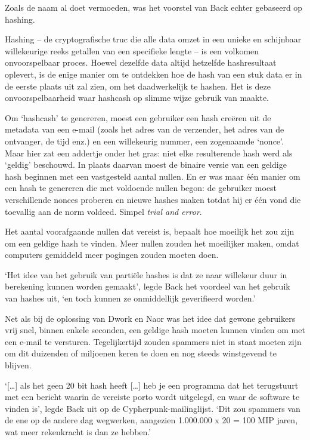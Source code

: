 \documentclass[
  a5paper,
  smalldemyvopaper,11pt,twoside,onecolumn,openright,extrafontsizes]{memoir}
\begin{document}
Zoals de naam al doet vermoeden, was het voorstel van Back echter
gebaseerd op hashing.

Hashing -- de cryptografische truc die alle data omzet in een unieke en
schijnbaar willekeurige reeks getallen van een specifieke lengte -- is
een volkomen onvoorspelbaar proces. Hoewel dezelfde data altijd
hetzelfde hashresultaat oplevert, is de enige manier om te ontdekken hoe
de hash van een stuk data er in de eerste plaats uit zal zien, om het
daadwerkelijk te hashen. Het is deze onvoorspelbaarheid waar hashcash op
slimme wijze gebruik van maakte.

Om `hashcash' te genereren, moest een gebruiker een hash creëren uit de
metadata van een e-mail (zoals het adres van de verzender, het adres van
de ontvanger, de tijd enz.) en een willekeurig nummer, een zogenaamde
`nonce'. Maar hier zat een addertje onder het gras: niet elke
resulterende hash werd als `geldig' beschouwd. In plaats daarvan moest
de binaire versie van een geldige hash beginnen met een vastgesteld
aantal nullen. En er was maar één manier om een hash te genereren die
met voldoende nullen begon: de gebruiker moest verschillende nonces
proberen en nieuwe hashes maken totdat hij er één vond die toevallig aan
de norm voldeed. Simpel \emph{trial and error}.

Het aantal voorafgaande nullen dat vereist is, bepaalt hoe moeilijk het
zou zijn om een geldige hash te vinden. Meer nullen zouden het
moeilijker maken, omdat computers gemiddeld meer pogingen zouden moeten
doen.

`Het idee van het gebruik van partiële hashes is dat ze naar willekeur
duur in berekening kunnen worden gemaakt', legde Back het voordeel van
het gebruik van hashes uit, `en toch kunnen ze onmiddellijk geverifieerd
worden.'

Net als bij de oplossing van Dwork en Naor was het idee dat gewone
gebruikers vrij snel, binnen enkele seconden, een geldige hash moeten
kunnen vinden om met een e-mail te versturen. Tegelijkertijd zouden
spammers niet in staat moeten zijn om dit duizenden of miljoenen keren
te doen en nog steeds winstgevend te blijven.

`{[}\ldots{]} als het geen 20 bit hash heeft {[}\ldots{]} heb je een
programma dat het terugstuurt met een bericht waarin de vereiste porto
wordt uitgelegd, en waar de software te vinden is', legde Back uit op de
Cypherpunk-mailinglijst. `Dit zou spammers van de ene op de andere dag
wegwerken, aangezien 1.000.000 x 20 = 100 MIP jaren, wat meer
rekenkracht is dan ze hebben.'
\end{document}
